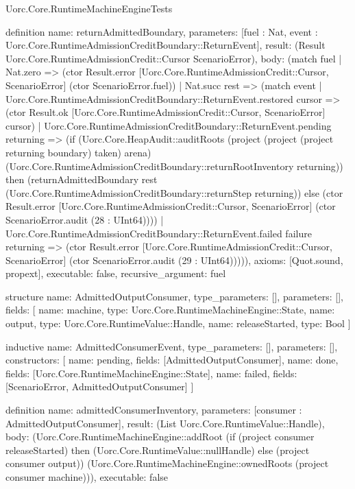 \begin{lexlean}{Uorc.Core.RuntimeMachineEngineTests}
\begin{semanticmodule}
definition{
  name: returnAdmittedBoundary,
  parameters: [fuel : Nat, event : Uorc.Core.RuntimeAdmissionCreditBoundary::ReturnEvent],
  result: (Result Uorc.Core.RuntimeAdmissionCredit::Cursor ScenarioError),
  body: (match fuel
    | Nat.zero => (ctor Result.error [Uorc.Core.RuntimeAdmissionCredit::Cursor, ScenarioError] (ctor ScenarioError.fuel))
    | Nat.succ rest => (match event
      | Uorc.Core.RuntimeAdmissionCreditBoundary::ReturnEvent.restored cursor => (ctor Result.ok [Uorc.Core.RuntimeAdmissionCredit::Cursor, ScenarioError] cursor)
      | Uorc.Core.RuntimeAdmissionCreditBoundary::ReturnEvent.pending returning => (if (Uorc.Core.HeapAudit::auditRoots (project (project (project returning boundary) taken) arena) (Uorc.Core.RuntimeAdmissionCreditBoundary::returnRootInventory returning)) then (returnAdmittedBoundary rest (Uorc.Core.RuntimeAdmissionCreditBoundary::returnStep returning)) else (ctor Result.error [Uorc.Core.RuntimeAdmissionCredit::Cursor, ScenarioError] (ctor ScenarioError.audit (28 : UInt64))))
      | Uorc.Core.RuntimeAdmissionCreditBoundary::ReturnEvent.failed failure returning => (ctor Result.error [Uorc.Core.RuntimeAdmissionCredit::Cursor, ScenarioError] (ctor ScenarioError.audit (29 : UInt64))))),
  axioms: [Quot.sound, propext],
  executable: false,
  recursive_argument: fuel
}

structure{
  name: AdmittedOutputConsumer,
  type_parameters: [],
  parameters: [],
  fields: [
    {name: machine, type: Uorc.Core.RuntimeMachineEngine::State},
    {name: output, type: Uorc.Core.RuntimeValue::Handle},
    {name: releaseStarted, type: Bool}
  ]
}

inductive{
  name: AdmittedConsumerEvent,
  type_parameters: [],
  parameters: [],
  constructors: [
    {name: pending, fields: [AdmittedOutputConsumer]},
    {name: done, fields: [Uorc.Core.RuntimeMachineEngine::State]},
    {name: failed, fields: [ScenarioError, AdmittedOutputConsumer]}
  ]
}

definition{
  name: admittedConsumerInventory,
  parameters: [consumer : AdmittedOutputConsumer],
  result: (List Uorc.Core.RuntimeValue::Handle),
  body: (Uorc.Core.RuntimeMachineEngine::addRoot (if (project consumer releaseStarted) then (Uorc.Core.RuntimeValue::nullHandle) else (project consumer output)) (Uorc.Core.RuntimeMachineEngine::ownedRoots (project consumer machine))),
  executable: false
}


\end{semanticmodule}
\end{lexlean}

